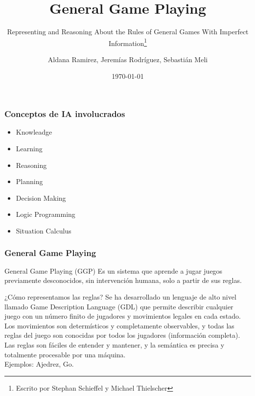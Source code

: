 \documentclass{beamer}
\title[]{General Game Playing} %
\subtitle{Representing and Reasoning About the Rules of General Games With Imperfect Information\footnote{Escrito por Stephan Schieffel y Michael Thielscher}}
\author[]{\scriptsize Aldana Ramirez, Jeremías Rodríguez, Sebastián Meli} %
\institute[UNR] %
{
\small Introducción a la Inteligencia Artificial\\
Universidad Nacional de Rosario %
}
\date{\today} %
\begin{document}
\begin{frame}
\titlepage %
\end{frame}





\begin{frame}
\frametitle{Conceptos de IA involucrados}
\begin{itemize}
\item Knowleadge
\item Learning
\item Reasoning
\item Planning
\item Decision Making
\item Logic Programming
\item Situation Calculus
\end{itemize}
\end{frame}



\begin{frame}
\frametitle{General Game Playing}
\begin{block}{General Game Playing (GGP)}
Es un sistema que aprende a jugar juegos previamente desconocidos, sin intervención humana, solo a partir de sus reglas.
\end{block}

\begin{block}{¿Cómo representamos las reglas?}
Se ha desarrollado un lenguaje de alto nivel llamado Game Description Language (GDL) que permite describir cualquier juego con un número finito de jugadores y movimientos legales en cada estado. \\
Los movimientos son determísticos y completamente observables, y todas las reglas del juego son conocidas por todos los jugadores (información completa). \\
Las reglas son fáciles de entender y mantener, y la semántica es precisa y totalmente procesable por una máquina.\\
Ejemplos: Ajedrez, Go.
\end{block}


\end{frame}
\end{document}
